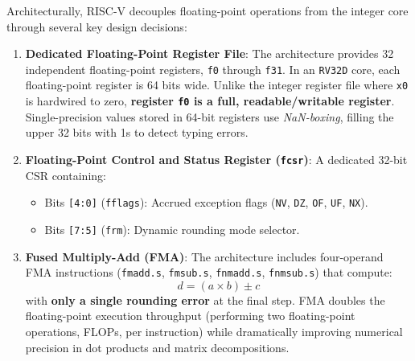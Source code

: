 Architecturally, RISC-V decouples floating-point operations from the integer core through several key design decisions:
\begin{enumerate}
    \item \textbf{Dedicated Floating-Point Register File}: The architecture provides 32 independent floating-point registers, \texttt{f0} through \texttt{f31}. In an \texttt{RV32D} core, each floating-point register is 64 bits wide. Unlike the integer register file where \texttt{x0} is hardwired to zero, \textbf{register \texttt{f0} is a full, readable/writable register}. Single-precision values stored in 64-bit registers use \emph{NaN-boxing}, filling the upper 32 bits with 1s to detect typing errors.
    \item \textbf{Floating-Point Control and Status Register (\texttt{fcsr})}: A dedicated 32-bit CSR containing:
    \begin{itemize}
        \item Bits \texttt{[4:0]} (\texttt{fflags}): Accrued exception flags (\texttt{NV}, \texttt{DZ}, \texttt{OF}, \texttt{UF}, \texttt{NX}).
        \item Bits \texttt{[7:5]} (\texttt{frm}): Dynamic rounding mode selector.
    \end{itemize}
    \item \textbf{Fused Multiply-Add (FMA)}: The architecture includes four-operand FMA instructions (\texttt{fmadd.s}, \texttt{fmsub.s}, \texttt{fnmadd.s}, \texttt{fnmsub.s}) that compute:
    \begin{equation}
    d = (a \times b) \pm c
    \end{equation}
    with \textbf{only a single rounding error} at the final step. FMA doubles the floating-point execution throughput (performing two floating-point operations, FLOPs, per instruction) while dramatically improving numerical precision in dot products and matrix decompositions.
\end{enumerate}

